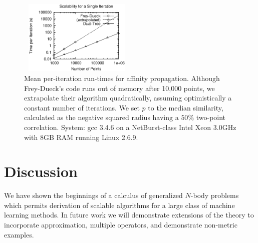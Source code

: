 \documentclass{article}
\newcommand{\killspace}{\vspace{-0.08in}}
\newcommand{\mysection}[1]{\vspace{-0.04in}\section{#1}\killspace}
\begin{document}
\begin{figure}
  \begin{minipage}{2.6in}
    \includegraphics[width=2.2in,height=1.4in]{r-speed.ps}
  \end{minipage}
  \begin{minipage}{2.6in}
      \caption{\label{fig:speed}\footnotesize Mean per-iteration run-times for affinity propagation.
	Although Frey-Dueck's code runs out of memory after 10,000 points, we extrapolate their algorithm quadratically, assuming optimistically a constant number of iterations.
	We set $p$ to the median similarity, calculated as the negative squared radius having a $50\%$ two-point correlation.
	System: gcc 3.4.6 on a NetBurst-class Intel Xeon 3.0GHz with 8GB RAM running Linux 2.6.9.}
  \end{minipage}
  \killspace
\end{figure}

\mysection{Discussion}

We have shown the beginnings of a calculus of generalized $N$-body problems which permits derivation of scalable algorithms for a large class of machine learning methods.
In future work we will demonstrate extensions of the theory to incorporate approximation, multiple operators, and demonstrate non-metric examples.

\appendix
\end{document}
